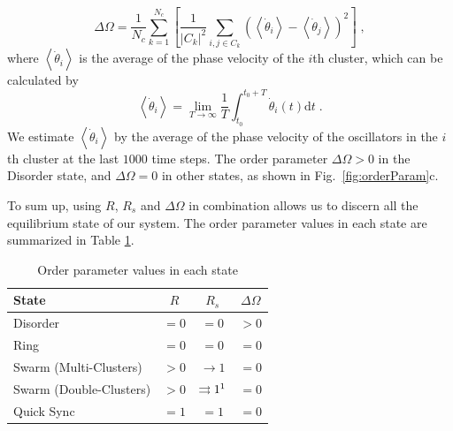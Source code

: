 \documentclass[%
 aip,
 amsmath,amssymb,
 reprint,%
]{revtex4-1}
\begin{document}
\begin{equation}
    \Delta \Omega =\frac{1}{N_c}\sum_{k=1}^{N_c}{\left[ \frac{1}{\left| C_k \right|^2}\sum_{i,j\in C_k}{\left( \left< \dot{\theta}_i \right> -\left< \dot{\theta}_j \right> \right) ^2} \right]}\;,
\end{equation}
where $\left< \dot{\theta}_i \right>$ is the average of the phase velocity of the $i$th cluster, which can be calculated by
\begin{equation}
    \left< \dot{\theta}_i \right> =\lim_{T\rightarrow \infty} \frac{1}{T}\int_{t_0}^{t_0+T}{\dot{\theta}_i\left( t \right) \mathrm{d}t}\;.
\end{equation}
We estimate $\left< \dot{\theta}_i \right>$ by the average of the phase velocity of the oscillators in the $i$th cluster at the last $1000$ time steps. 
The order parameter $\Delta \Omega > 0$ in the Disorder state, and $\Delta \Omega = 0$ in other states, as shown in Fig.~\ref{fig:orderParam}c.

To sum up, using $R$, $R_s$ and $\Delta \Omega$ in combination allows us to discern all the equilibrium state of our system.
The order parameter values in each state are summarized in Table \ref{tab:orderParam}.

\begin{table}
    \caption{\label{tab:orderParam} Order parameter values in each state 
    }
    \begin{ruledtabular}
        \begin{tabular}{lccc}
        State& $R$ & $R_s$ & $\Delta\Omega$ \\
        \hline
        Disorder&$=0$&$=0$&$> 0$\\
        Ring&$=0$&$=0$&$=0$\\
        Swarm (Multi-Clusters)&$> 0$&$\rightarrow 1$\footnotemark[1]&$=0$\\
        Swarm (Double-Clusters)&$> 0$&$\rightrightarrows 1\footnotemark[1]$&$=0$\\
        Quick Sync&$=1$&$=1$&$=0$\\
        \end{tabular}
    \end{ruledtabular}
\end{table}
\end{document}
